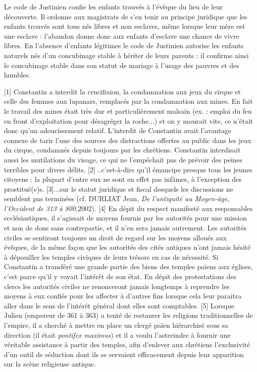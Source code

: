  Le code de Justinien confie les enfants trouvés à l'évêque du lieu de leur découverte. Il ordonne aux magistrats de s'en tenir au principe juridique que les enfants trouvés sont tous nés libres et non esclaves, même lorsque leur mère est une esclave : l'abandon donne donc aux enfants d'esclave une chance de vivre libres. 
 En l'absence d'enfants légitimes le code de Justinien autorise les enfants naturels nés d'un concubinage stable à hériter de leurs parents : il confirme ainsi le concubinage stable dans son statut de mariage à l'usage des pauvres et des humbles. 
 
[1] Constantin a interdit la crucifixion, la condamnation aux jeux du cirque et celle des femmes aux lupanars, remplacés par la condamnation aux mines. En fait le travail des mines était très dur et particulièrement malsain (ex. : emploi du feu en front d'exploitation pour désagréger la roche...) et on y mourait vite, ce n'était donc qu'un adoucissement relatif. L'interdit de Constantin avait l'avantage connexe de tarir l'une des sources des distractions offertes au public dans les jeux du cirque, condamnés depuis toujours par les chrétiens. Constantin interdisait aussi les mutilations du visage, ce qui ne l'empêchait pas de prévoir des peines terribles pour divers délits.
[2] ..c'est-à-dire qu'il émancipe presque tous les jeunes citoyens : la plupart d'entre eux ne sont en effet pas infâmes, à l'exception des prostitué(e)s.
[3]...sur le statut juridique et fiscal desquels les discussions ne semblent pas terminées (cf. DURLIAT Jean,\emph{ De l'antiquité au Moyen-âge, l'Occident de 313 à 800,}2002).
[4] En dépit du respect manifesté aux responsables ecclésiastiques, il s'agissait de moyens fournis par les autorités pour une mission et non de dons sans contrepartie, et il n'en sera jamais autrement. Les autorités civiles se sentiront toujours un droit de regard sur les moyens alloués aux évêques, de la même façon que les autorités des cités antiques n'ont jamais hésité à dépouiller les temples civiques de leurs trésors en cas de nécessité. Si Constantin a transféré une grande partie des biens des temples païens aux églises, c'est parce qu'il y voyait l'intérêt de son état. En dépit des protestations des clercs les autorités civiles ne renonceront jamais longtemps à reprendre les moyens à eux confiés pour les affecter à d'autres fins lorsque cela leur paraitra aller dans le sens de l'intérêt général dont elles sont comptables.
[5] Lorsque Julien (empereur de 361 à 363) a tenté de restaurer les religions traditionnelles de l'empire, il a cherché à mettre en place un clergé païen hiérarchisé sous sa direction (il était \emph{pontifex maximus}) et il a voulu l'astreindre à fournir une véritable assistance à partir des temples, afin d'enlever aux chrétiens l'exclusivité d'un outil de séduction dont ils se servaient efficacement depuis leur apparition sur la scène religieuse antique. 
